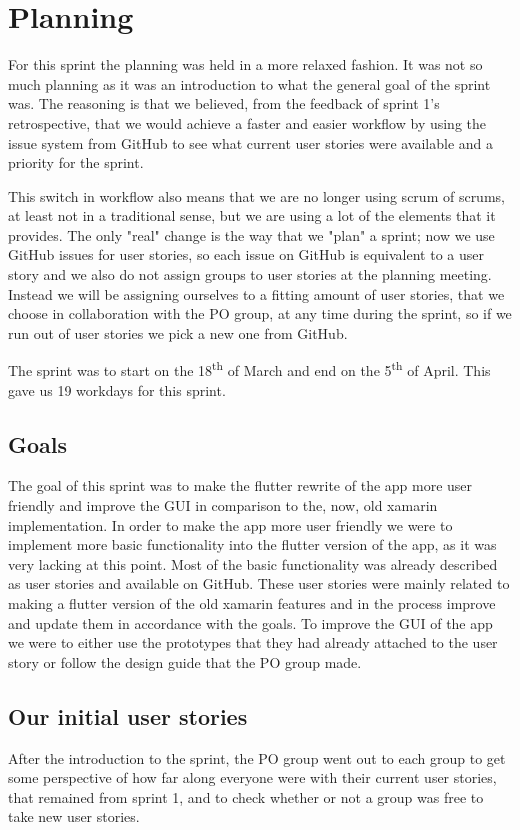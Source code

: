 \section{Planning}
For this sprint the planning was held in a more relaxed fashion.
It was not so much planning as it was an introduction to what the general goal of the sprint was.
The reasoning is that we believed, from the feedback of sprint 1's retrospective, that we would achieve a faster and easier workflow by using the issue system from GitHub to see what current user stories were available and a priority for the sprint. 

This switch in workflow also means that we are no longer using scrum of scrums, at least not in a traditional sense, but we are using a lot of the elements that it provides.
The only "real" change is the way that we "plan" a sprint; now we use GitHub issues for user stories, so each issue on GitHub is equivalent to a user story and we also do not assign groups to user stories at the planning meeting. 
Instead we will be assigning ourselves to a fitting amount of user stories, that we choose in collaboration with the PO group, at any time during the sprint, so if we run out of user stories we pick a new one from GitHub. 

The sprint was to start on the 18\textsuperscript{th} of March and end on the 5\textsuperscript{th} of April. This gave us 19 workdays for this sprint.

\subsection{Goals}
The goal of this sprint was to make the flutter rewrite of the app more user friendly and improve the GUI in comparison to the, now, old xamarin implementation.
In order to make the app more user friendly we were to implement more basic functionality into the flutter version of the app, as it was very lacking at this point.
Most of the basic functionality was already described as user stories and available on GitHub. 
These user stories were mainly related to making a flutter version of the old xamarin features and in the process improve and update them in accordance with the goals.
To improve the GUI of the app we were to either use the prototypes that they had already attached to the user story or follow the design guide that the PO group made.

\subsection{Our initial user stories}
After the introduction to the sprint, the PO group went out to each group to get some perspective of how far along everyone were with their current user stories, that remained from sprint 1, and to check whether or not a group was free to take new user stories.

